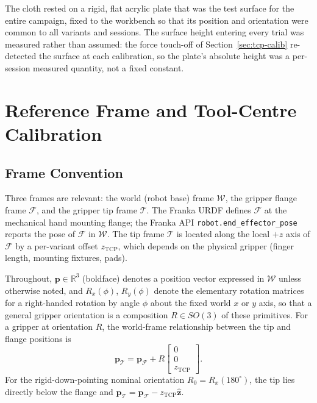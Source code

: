 The cloth rested on a rigid, flat acrylic plate that was the test
surface for the entire campaign, fixed to the workbench so that its
position and orientation were common to all variants and sessions. The
surface height entering every trial was measured rather than assumed: the
force touch-off of Section~\ref{sec:tcp-calib} re-detected the surface
at each calibration, so the plate's absolute height was a per-session
measured quantity, not a fixed constant.


\section{Reference Frame and Tool-Centre Calibration}

\subsection{Frame Convention}
\label{sec:frames}

Three frames are relevant: the world (robot base) frame $\mathcal{W}$,
the gripper flange frame $\mathcal{F}$, and the gripper tip frame $\mathcal{T}$.
The Franka URDF defines $\mathcal{F}$ at the mechanical hand mounting flange;
the Franka API \texttt{robot.end\_effector\_pose} reports the pose of
$\mathcal{F}$ in $\mathcal{W}$. The tip frame $\mathcal{T}$ is located along
the local $+z$ axis of $\mathcal{F}$ by a per-variant offset $z_{\text{TCP}}$,
which depends on the physical gripper (finger length, mounting fixtures, pads).

Throughout, $\mathbf{p} \in \mathbb{R}^3$ (boldface) denotes a position
vector expressed in $\mathcal{W}$ unless otherwise noted, and
$R_x(\phi)$, $R_y(\phi)$ denote the elementary rotation matrices for a
right-handed rotation by angle $\phi$ about the fixed world $x$ or $y$
axis, so that a general gripper orientation is a composition
$R \in SO(3)$ of these primitives. For a gripper at orientation $R$,
the world-frame relationship between the tip and flange positions is
\begin{equation}
  \mathbf{p}_\mathcal{T} = \mathbf{p}_\mathcal{F} + R \begin{bmatrix} 0 \\ 0 \\ z_{\text{TCP}} \end{bmatrix}.
  \label{eq:tip-from-flange}
\end{equation}
For the rigid-down-pointing nominal orientation $R_0 = R_x(180^{\circ})$,
the tip lies directly below the flange and
$\mathbf{p}_\mathcal{T} = \mathbf{p}_\mathcal{F} - z_{\text{TCP}} \hat{\mathbf{z}}$.

